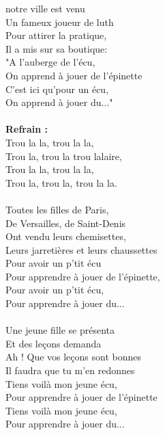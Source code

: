 %
 notre ville est venu ~~~~~~~ \bissimplemple
\\Un fameux joueur de luth ~~ \bissimplemple
\\Pour attirer la pratique,
\\Il a mis sur sa boutique:
\\"A l'auberge de l'écu,
\\On apprend à jouer de l'épinette
\\C'est ici qu'pour un écu,
\\On apprend à jouer du..."
\\\\\textbf{Refrain :}
\\Trou la la, trou la la,
\\Trou la, trou la trou lalaire,
\\Trou la la, trou la la,
\\Trou la, trou la, trou la la.
\\\\Toutes les filles de Paris, ~~~~~~~\bissimplemple
\\De Versailles, de Saint-Denis ~~\bissimplemple
\\Ont vendu leurs chemisettes,
\\Leurs jarretières et leurs chaussettes
\\Pour avoir un p'tit écu
\\Pour apprendre à jouer de l'épinette,
\\Pour avoir un p'tit écu,
\\Pour apprendre à jouer du...
\\\\Une jeune fille se présenta ~~ \bissimplemple
\\Et des leçons demanda ~~~~~~ \bissimplemple
\\Ah ! Que vos leçons sont bonnes
\\Il faudra que tu m'en redonnes
\\Tiens voilà mon jeune écu,
\\Pour apprendre à jouer de l'épinette
\\Tiens voilà mon jeune écu,
\\Pour apprendre à jouer du...
